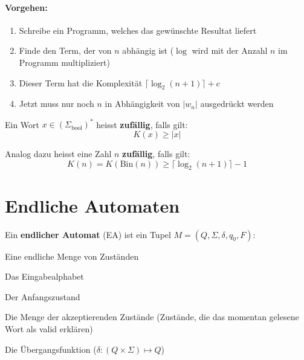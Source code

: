 \documentclass[11pt]{article}
\begin{document}
\paragraph{Vorgehen:}
\begin{enumerate}[noitemsep]
	\item Schreibe ein Programm, welches das gew{\"u}nschte Resultat liefert
	\item Finde den Term, der von $n$ abh{\"a}ngig ist ($\log$ wird mit der Anzahl $n$ im Programm multipliziert)
	\item Dieser Term hat die Komplexit{\"a}t $\lceil \log_2(n + 1) \rceil + c$
	\item Jetzt muss nur noch $n$ in Abh{\"a}ngigkeit von $|w_n|$ ausgedr{\"u}ckt werden
\end{enumerate}

Ein Wort $x \in (\Sigma_\text{bool})^*$ heisst \textbf{zuf{\"a}llig}, falls gilt:
\begin{equation*}
	K(x) \geq |x|
\end{equation*}

Analog dazu heisst eine Zahl $n$ \textbf{zuf{\"a}llig}, falls gilt:
\begin{equation*}
	K(n) = K(\text{Bin}(n)) \geq \lceil\log_2(n+1)\rceil-1
\end{equation*}

\section{Endliche Automaten}

Ein \textbf{endlicher Automat} (EA) ist ein Tupel $M = (Q, \Sigma, \delta, q_0, F)$:
\begin{description}[labelindent=16pt,style=multiline,leftmargin=2.5cm, noitemsep]
	\item[$Q$:] Eine endliche Menge von Zust{\"a}nden
	\item[$\Sigma$:] Das Eingabealphabet
	\item[$q_0 \in Q$:] Der Anfangszustand
	\item[$F \subseteq Q$:] Die Menge der akzeptierenden Zust{\"a}nde (Zust{\"a}nde, die das momentan gelesene Wort als valid erkl{\"a}ren)
	\item[$\delta$:] Die {\"U}bergangsfunktion ($\delta: (Q\times\Sigma) \mapsto Q$)
\end{description}
\end{document}
